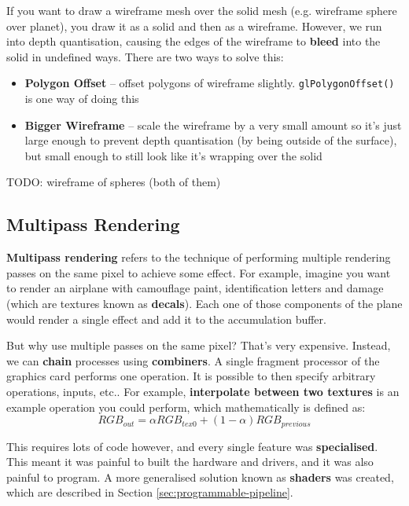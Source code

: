 \documentclass{article}
\begin{document}
If you want to draw a wireframe mesh over the solid mesh (e.g. wireframe sphere over planet), you draw it as a solid and then as a wireframe. However, we run into depth quantisation, causing the edges of the wireframe to \textbf{bleed} into the solid in undefined ways. There are two ways to solve this:
\begin{itemize}
	\item \textbf{Polygon Offset} -- offset polygons of wireframe slightly. \texttt{glPolygonOffset()} is one way of doing this
	\item \textbf{Bigger Wireframe} -- scale the wireframe by a very small amount so it's just large enough to prevent depth quantisation (by being outside of the surface), but small enough to still look like it's wrapping over the solid
\end{itemize}

TODO: wireframe of spheres (both of them)

\subsection{Multipass Rendering}

\textbf{Multipass rendering} refers to the technique of performing multiple rendering passes on the same pixel to achieve some effect. For example, imagine you want to render an airplane with camouflage paint, identification letters and damage (which are textures known as \textbf{decals}). Each one of those components of the plane would render a single effect and add it to the accumulation buffer. 

But why use multiple passes on the same pixel? That's very expensive. Instead, we can \textbf{chain} processes using \textbf{combiners}. A single fragment processor of the graphics card performs one operation. It is possible to then specify arbitrary operations, inputs, etc.. For example, \textbf{interpolate between two textures} is an example operation you could perform, which mathematically is defined as:
\begin{equation}
	RGB_{out} = \alpha RGB_{tex0} + (1- \alpha) RGB_{previous}
\end{equation}

This requires lots of code however, and every single feature was \textbf{specialised}. This meant it was painful to built the hardware and drivers, and it was also painful to program. A more generalised solution known as \textbf{shaders} was created, which are described in Section \ref{sec:programmable-pipeline}.
\end{document}
